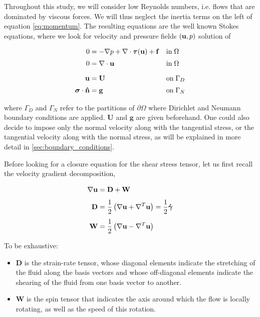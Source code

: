 \documentclass[11 pt]{report}
\begin{document}
Throughout this study, we will consider low Reynolds numbers, i.e. flows that are dominated by viscous forces. We will thus neglect the inertia terms on the left of equation \eqref{eq:momentum}. The resulting equations are the well known Stokes equations, where we look for velocity and pressure fields $(\mathbf{u},p)$ solution of
\begin{empheqboxed}
    \begin{align}
        0 &= -\nabla p + \nabla \cdot \boldsymbol \tau(\mathbf{u}) + \mathbf{f} &&\text{in} \; \Omega \label{eq:momentum} \\[2pt]
        0 &= \nabla \cdot \mathbf{u} &&\text{in}\; \Omega \label{eq:mass}\\[6pt]
        \mathbf{u} &= \mathbf{U} &&\text{on}\; \Gamma_{D} \label{eq:Dirichlet}\\[2pt]
        \boldsymbol \sigma \cdot \mathbf{\hat n} &= \mathbf{g} &&\text{on}\; \Gamma_{N} \label{eq:Neumann}
    \end{align}
\end{empheqboxed}
where $\Gamma_{D}$ and $\Gamma_{N}$ refer to the partitions of $\partial \Omega$ where Dirichlet and Neumann boundary conditions are applied. $\mathbf{U}$ and $\mathbf{g}$ are given beforehand. One could also decide to impose only the normal velocity along with the tangential stress, or the tangential velocity along with the normal stress, as will be explained in more detail in \cref{sec:boundary_conditions}.

Before looking for a closure equation for the shear stress tensor, let us first recall the velocity gradient decomposition,
\begin{empheqboxed}
    \begin{align}
        \nabla \mathbf{u} &= \mathbf{D} + \mathbf{W}\\[4pt]
        \mathbf{D} &= \frac{1}{2} \left(\nabla \mathbf{u} + \nabla^T \mathbf{u}\right) = \frac{1}{2} \boldsymbol{\dot \gamma}\\[4pt]
        \mathbf{W} &= \frac{1}{2} \left(\nabla \mathbf{u} - \nabla^T \mathbf{u}\right)
    \end{align}
\end{empheqboxed}

To be exhaustive:
\begin{itemize}[label=---]
    \item $\mathbf{D}$ is the strain-rate tensor, whose diagonal elements indicate the stretching of the fluid along the basis vectors and whose off-diagonal elements indicate the shearing of the fluid from one basis vector to another.
    \item $\mathbf{W}$ is the spin tensor that indicates the axis around which the flow is locally rotating, as well as the speed of this rotation.
\end{itemize} 
\end{document}
